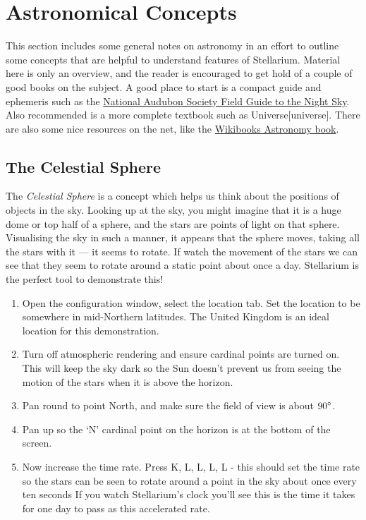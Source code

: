 
\chapter{Astronomical Concepts}
This section includes some general notes on astronomy in an effort to
outline some concepts that are helpful to understand features of
Stellarium. Material here is only an overview, and the reader is
encouraged to get hold of a couple of good books on the subject. A good
place to start is a compact guide and ephemeris such as the
\href{http://www.amazon.com/National-Audubon-Society-Field-Series/dp/0679408525}{National
Audubon Society Field Guide to the Night Sky}. Also recommended is a
more complete textbook such as Universe{[}universe{]}. There are also
some nice resources on the net, like the
\href{http://en.wikibooks.org/wiki/Subject:Astronomy}{Wikibooks
Astronomy book}.

\section{The Celestial Sphere}\label{the-celestial-sphere}

The \emph{Celestial Sphere} is a concept which helps us think about the
positions of objects in the sky. Looking up at the sky, you might
imagine that it is a huge dome or top half of a sphere, and the stars
are points of light on that sphere. Visualising the sky in such a
manner, it appears that the sphere moves, taking all the stars with it
--- it seems to rotate. If watch the movement of the stars we can see
that they seem to rotate around a static point about once a day.
Stellarium is the perfect tool to demonstrate this!

\begin{enumerate}
\item
  Open the configuration window, select the location tab. Set the
  location to be somewhere in mid-Northern latitudes. The United Kingdom
  is an ideal location for this demonstration.
\item
  Turn off atmospheric rendering and ensure cardinal points are turned
  on. This will keep the sky dark so the Sun doesn't prevent us from
  seeing the motion of the stars when it is above the horizon.
\item
  Pan round to point North, and make sure the field of view is about
  $90\degree$.
\item
  Pan up so the `N' cardinal point on the horizon is at the bottom of
  the screen.
\item
  Now increase the time rate. Press K, L, L, L, L - this should set the
  time rate so the stars can be seen to rotate around a point in the sky
  about once every ten seconds If you watch Stellarium's clock you'll
  see this is the time it takes for one day to pass as this accelerated
  rate.
\end{enumerate}

